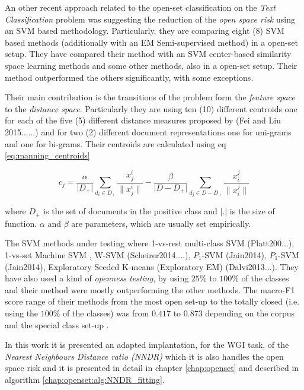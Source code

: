 An other recent approach related to the open-set classification on the \textit{Text Classification} problem was suggesting the reduction of the \textit{open space risk} using an SVM based methodology. Particularly, they are comparing eight (8) SVM based methods (additionally with an EM Semi-supervised method) in a open-set setup. They have compared their method with an  SVM center-based similarity space learning methods and some other methods, also in a open-set setup. Their method outperformed the others significantly, with some exceptions. 

Their main contribution is the transitions of the problem form the \textit{feature space} to the \textit{distance space}. Particularly they are using ten (10) different centroids one for each of the five (5) different distance measures proposed by (Fei and Liu 2015......) and for two (2) different document representations one for uni-grams and one for bi-grams. Their centroids are calculated using  eq \ref{eq:manning_centroids} 

\begin{equation}\label{eq:manning_centroids}
	c_{j} = \frac{\alpha}{\lvert D_{+} \rvert} \sum_{d_{i} \in D_{+}} \frac{x_{j}^{i}}{\lVert x_{j}^{i} \rVert } - \frac{\beta}{\lvert D - D_{+} \rvert} \sum_{d_{j} \in D - D_{+}} \frac{x_{i}^{j}}{\lVert x_{i}^{j} \rVert}
\end{equation}

where $D_{+}$ is the set of documents in the positive class and $\lvert . \rvert$ is the size of function. $\alpha$ and $\beta$ are parameters, which are usually set empirically.

The SVM methods under testing where 1-vs-rest multi-class SVM (Platt200...), 1-vs-set Machine SVM \parencite{scheirer2013toward}, W-SVM (Scheirer2014....), $P_{1}$-SVM (Jain2014), $P_{1}$-SVM (Jain2014), Exploratory Seeded K-means (Exploratory EM) (Dalvi2013...). They have also used a kind of \textit{openness testing}, by using $25\%$ to $100\%$ of the classes and their method were mostly outperforming the other methods. The macro-F1 score range of their methods from the most open set-up to the totally closed (i.e. using the $100\%$ of the classes) was from $0.417$ to $0.873$ depending on the corpus and the special class set-up \parencite{fei2016breaking}.

In this work it is presented an adapted implantation, for the WGI task, of the \textit{Nearest Neighbours Distance ratio (NNDR)} which it is also handles the open space risk and it is presented in detail in chapter \ref{chap:openset} and described in algorithm \ref{chap:openset:alg:NNDR_fitting}.

